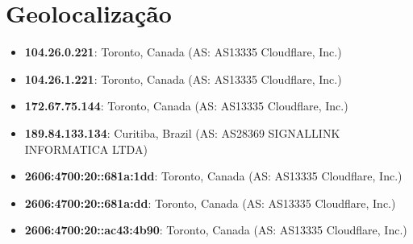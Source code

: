 
\section{Geolocalização}
\begin{itemize}
\item \textbf{104.26.0.221}: Toronto, Canada (AS: AS13335 Cloudflare, Inc.)\item \textbf{104.26.1.221}: Toronto, Canada (AS: AS13335 Cloudflare, Inc.)\item \textbf{172.67.75.144}: Toronto, Canada (AS: AS13335 Cloudflare, Inc.)\item \textbf{189.84.133.134}: Curitiba, Brazil (AS: AS28369 SIGNALLINK INFORMATICA LTDA)\item \textbf{2606:4700:20::681a:1dd}: Toronto, Canada (AS: AS13335 Cloudflare, Inc.)\item \textbf{2606:4700:20::681a:dd}: Toronto, Canada (AS: AS13335 Cloudflare, Inc.)\item \textbf{2606:4700:20::ac43:4b90}: Toronto, Canada (AS: AS13335 Cloudflare, Inc.)
\end{itemize}
